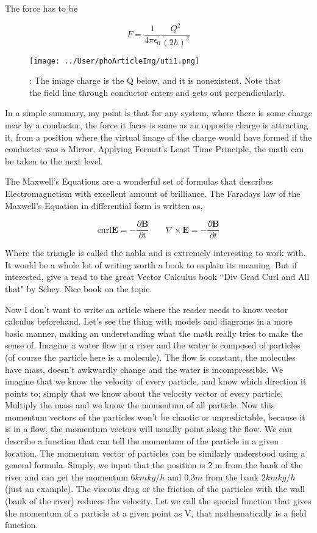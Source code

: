 \documentclass[11pt,a4paper]{article}
\renewcommand{\vec}[1]{\boldsymbol{#1}}
\begin{document}
The force has to be

	\begin{equation}
	F = \frac{1}{4 \pi \epsilon_0}
	\frac{Q^2}{(2h)^2}
	\end{equation}


\begin{figure}[hbtp]
\centering
\texttt{[image: ../User/phoArticleImg/uti1.png]}
\caption{: The image charge is the Q below, and it is nonexistent. Note that the field line through conductor enters and gets out perpendicularly. }
\end{figure}


In a simple summary, my point is that for any system, where there is some charge near by a conductor, the force it faces is same as an opposite charge is attracting it, from a position where the virtual image of the charge would have formed if the conductor was a Mirror. Applying Fermat's Least Time Principle, the math can be taken to the next level.


The Maxwell's Equations are a wonderful set of formulas that describes Electromagnetism with excellent amount of brilliance. The Faradays law of the Maxwell's Equation in differential form is written as,


	\begin{equation}
	\text{curl} \vec{E} = - \frac{\partial \vec{B}}{\partial t} 
	\qquad
	\nabla \times \vec{E} = - \frac{\partial \vec{B}}{\partial t} 
	\end{equation}


Where the triangle is called the nabla and is extremely interesting to work with. It would be a whole lot of writing worth a book to explain its meaning. But if interested, give a read to the great Vector Calculus book  ``Div Grad Curl and All that" by Schey. Nice book on the topic.  


Now I don't want to write an article where the reader needs to know vector calculus beforehand. Let's see the thing with models and diagrams in a more basic manner, making an understanding what the math really tries to make the sense of. Imagine a water flow in a river and the water is composed of particles (of course the particle here is a molecule). The flow is constant, the molecules have mass, doesn't awkwardly change and the water is incompressible. We imagine that we know the velocity of every particle, and know which direction it points to; simply that we know about the velocity vector of every particle. Multiply the mass and we know the momentum of all particle. Now this momentum vectors of the particles won't be chaotic or unpredictable, because it is in a flow, the momentum vectors will usually point along the flow. We can describe a function that can tell the momentum of the particle in a given location. The momentum vector of particles can be similarly understood using a general formula. Simply, we input that the position is 2 m from the bank of the river and can get the momentum $6kmkg/h$ and $0.3 m$ from the bank $2kmkg/h$ (just an example). The viscous drag or the friction of the particles with the wall (bank of the river) reduces the velocity. Let we call the special function that gives the momentum of a particle at a given point as V, that mathematically is a field function.
\end{document}

